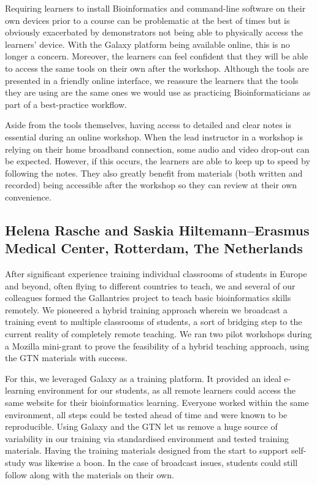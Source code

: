 Requiring learners to install Bioinformatics and command-line software on their own devices prior to a course can be problematic at the best of times but is obviously exacerbated by demonstrators not being able to physically access the learners’ device. With the Galaxy platform being available online, this is no longer a concern. Moreover, the learners can feel confident that they will be able to access the same tools on their own after the workshop. Although the tools are presented in a friendly online interface, we reassure the learners that the tools they are using are the same ones we would use as practicing Bioinformaticians as part of a best-practice workflow.

Aside from the tools themselves, having access to detailed and clear notes is essential during an online workshop. When the lead instructor in a workshop is relying on their home broadband connection, some audio and video drop-out can be expected. However, if this occurs, the learners are able to keep up to speed by following the notes. They also greatly benefit from materials (both written and recorded) being accessible after the workshop so they can review at their own convenience.

\subsection*{Helena Rasche and Saskia Hiltemann–Erasmus Medical Center, Rotterdam, The Netherlands}


After significant experience training individual classrooms of students in Europe and beyond, often flying to different countries to teach, we and several of our colleagues formed the Gallantries project to teach basic bioinformatics skills remotely. We pioneered a hybrid training approach wherein we broadcast a training event to multiple classrooms of students, a sort of bridging step to the current reality of completely remote teaching. We ran two pilot workshops during a Mozilla mini-grant to prove the feasibility of a hybrid teaching approach, using the GTN materials with success.

For this, we leveraged Galaxy as a training platform. It provided an ideal e-learning environment for our students, as all remote learners could access the same website for their bioinformatics learning. Everyone worked within the same environment, all steps could be tested ahead of time and were known to be reproducible. Using Galaxy and the GTN let us remove a huge source of variability in our training via standardised environment and tested training materials. Having the training materials designed from the start to support self-study was likewise a boon. In the case of broadcast issues, students could still follow along with the materials on their own.

